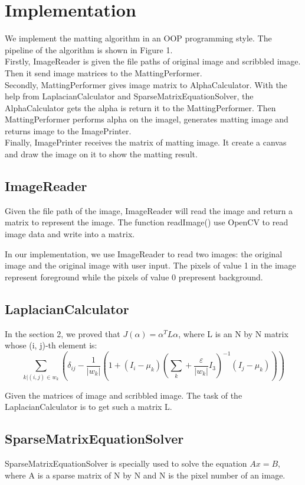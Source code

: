 \documentclass[11pt,letterpaper]{article}
\begin{document}
\section{Implementation}
We implement the matting algorithm in an OOP programming style. The pipeline of the algorithm is shown in Figure 1. \\

Firstly, ImageReader is given the file paths of original image and scribbled image. Then it send image matrices to the MattingPerformer. \\

Secondly, MattingPerformer gives image matrix to AlphaCalculator. With the help from LaplacianCalculator and SparseMatrixEquationSolver, the AlphaCalculator gets the alpha is return it to the MattingPerformer. Then MattingPerformer performs alpha on the imagel, generates matting image and returns image to the ImagePrinter.\\

Finally, ImagePrinter receives the matrix of matting image. It create a canvas and draw the image on it to show the matting result. 

\subsection{ImageReader}
Given the file path of the image, ImageReader will read the image and return a matrix to represent the image. The function readImage() use OpenCV to read image data and write into a matrix. 

In our implementation, we use ImageReader to read two images: the original image and the original image with user input. The pixels of value 1 in the image represent foreground while the pixels of value 0 prepresent background. 

\subsection{LaplacianCalculator}
In the section 2, we proved that $J(\alpha) = \alpha^T L \alpha$, where L is an N by N matrix whose (i, j)-th element is:
$$\sum_{k|(i,j) \in w_k} (\delta_{ij} - \frac{1}{|w_k|}(1 + (I_i - \mu_k)(\sum_k + \frac{\varepsilon}{|w_k|}I_3)^{-1}(I_j - \mu_k)))$$

Given the matrices of image and scribbled image. The task of the LaplacianCalculator is to get such a matrix L. 

\subsection{SparseMatrixEquationSolver}
SparseMatrixEquationSolver is specially used to solve the equation $Ax=B$, where A is a sparse matrix of N by N and N is the pixel number of an image. \\
\end{document}
